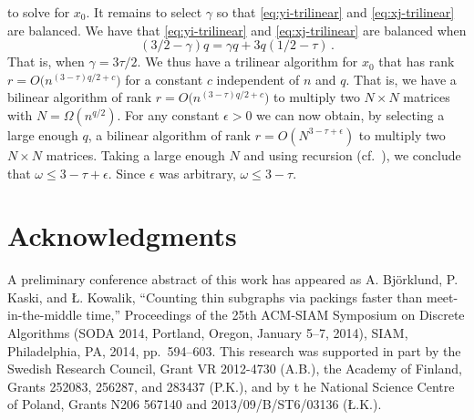 \documentclass{amsart}
\begin{document}
to solve for $x_0$. It remains to select $\gamma$ so that 
\eqref{eq:yi-trilinear} and \eqref{eq:xj-trilinear} are balanced.
We have that \eqref{eq:yi-trilinear} and 
\eqref{eq:xj-trilinear} are balanced when
\[
(3/2-\gamma)q=\gamma q+3q(1/2-\tau)\,.
\]
That is, when $\gamma = 3\tau/2$. We thus have a trilinear algorithm 
for $x_0$ that has rank $r=O\bigl(n^{(3-\tau)q/2+c}\bigr)$ for a 
constant $c$ independent of $n$ and $q$.
That is, we have a bilinear algorithm of rank 
$r=O\bigl(n^{(3-\tau)q/2+c}\bigr)$ to multiply two $N\times N$ matrices
with $N=\Omega(n^{q/2})$. For any constant $\epsilon>0$ we can now
obtain, by selecting a large enough $q$, a bilinear algorithm of
rank $r=O(N^{3-\tau+\epsilon})$ to multiply two $N\times N$ matrices.
Taking a large enough $N$ and using recursion 
(cf.~\cite[Theorem~2.1]{Pan1984}), we conclude that 
$\omega\leq 3-\tau+\epsilon$. Since $\epsilon$ was arbitrary,
$\omega\leq 3-\tau$.




\section*{Acknowledgments}

A preliminary conference abstract of this work has appeared as A. Bj\"orklund, P. Kaski, and \L. Kowalik, ``Counting thin subgraphs via packings faster than meet-in-the-middle time,'' Proceedings of the 25th ACM-SIAM Symposium on Discrete Algorithms (SODA 2014, Portland, Oregon, January 5--7, 2014), SIAM, Philadelphia, PA, 2014, pp.~594--603.
This research was supported in part by the 
Swedish Research Council, Grant VR 2012-4730 (A.B.),
the Academy of Finland, Grants 252083, 256287, and 283437 (P.K.), and 
by t	he National Science Centre of Poland, Grants N206 567140 and 2013/09/B/ST6/03136 (\L.K.).
\end{document}
